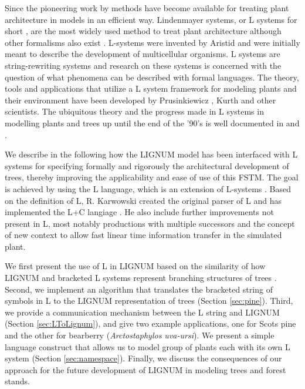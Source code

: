Since  the pioneering  work  by \citet{honda:71}  methods have  become
available for  treating plant architecture  in models in  an efficient
way.  Lindenmayer  systems, or L systems for  short \citep{pp:89}, are
the most widely used method to treat plant architecture although other
formalisms    also   exist    \citep[e.g.][]{dereffye:97,   godin:99}.
L-systems    were   invented    by    Aristid   \citet{lindenmayer:68,
lindenmayer:71} and  were initially meant to  describe the development
of  multicellular organisms.  L  systems are  string-rewriting systems
and research on  these systems is concerned with  the question of what
phenomena can  be described with formal languages.   The theory, tools
and applications that utilize a L system framework for modeling plants
and   their   environment  have   been   developed  by   Prusinkiewicz
\citep{pp:89,pp:92}, Kurth \citep{kurth:94} and other scientists.  The
ubiquitous  theory and  the progress  made in  L systems  in modelling
plants and trees  up until the end of the '90's  is well documented in
\citet{pp:90,pp:99} and \citet{kurth:99}.

We describe in the following  how the LIGNUM model has been interfaced
with   L  systems   for   specifying  formally   and  rigorously   the
architectural   development   of    trees,   thereby   improving   the
applicability and ease  of use of this FSTM.  The  goal is achieved by
using   the  L   language,  which   is  an   extension   of  L-systems
\citep{pp:99a}.  Based  on the definition of L,  R.  Karwowski created
the  original  parser  of  L  and has  implemented  the  L+C  langiage
\citep{karwowski:02}. He also include further improvements not present
in  L,  most notably  productions  with  multiple  successors and  the
concept of new context  \citep{karwowski:03} to allow fast linear time
information transfer in the simulated plant.

We first present the use of L in LIGNUM based on the similarity of how
LIGNUM and bracketed L systems represent branching structures of trees
\citep{perttunen:96, perttunen:01}.  Second, we implement an algorithm
that translates  the bracketed  string of symbols  in L to  the LIGNUM
representation of trees (Section \ref{sec:pine}).  Third, we provide a
communication  mechanism  between the  L  string  and LIGNUM  (Section
\ref{sec:LToLignum}), and give two example applications, one for Scots
pine and  the other for  bearberry (\textit{Arctostaphylos uva-ursi}).
We present a  simple language construct that allows  us to model group
of plants  each with its  own L system  (Section \ref{sec:namespace}).
Finally, we  discuss the consequences  of our approach for  the future
development of LIGNUM in modeling trees and forest stands.

